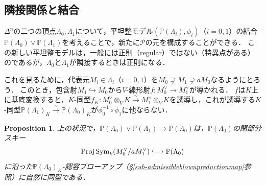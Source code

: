 \documentclass[a4paper,12pt, dvipdfmx]{jsbook}
\def\P{\mathbb{P}}
\def\Proj{\mathop{\mathrm{Proj}}\nolimits}
\def\Sym{\mathop{\mathrm{Sym}}\nolimits}
\theoremstyle{plain}
\newtheorem{prop}[thm]{\bfseries Proposition}
\theoremstyle{definition}
\def\longhookrightarrow{\lhook\joinrel\longrightarrow}
\begin{document}
\subsection{隣接関係と結合}\label{sub-join}
$\Delta^n$の二つの頂点$\Lambda_0,\Lambda_1$について，平坦整モデル$(\P(\Lambda_i),\phi_i)$（$i=0,1$）の結合$\P(\Lambda_0)\vee\P(\Lambda_1)$を考えることで，新たに$\mathcal{P}$の元を構成することができる．
この新しい平坦整モデルは，一般には正則（regular）ではない（特異点がある）のであるが，$\Lambda_0$と$\Lambda_1$が隣接するときは正則になる．

これを見るために，代表元$M_i\in\Lambda_i$（$i=0,1$）を$M_0\supsetneq M_1\supsetneq aM_0$なるようにとろう．
このとき，包含射$M_1\hookrightarrow M_0$から$V$-線形射$f\colon M^{\vee}_0\rightarrow M^{\vee}_1$が導かれる．
$f$は$K$上に基底変換すると，$K$-同型$f_K\colon M^{\vee}_0\otimes_VK\stackrel{\sim}{\rightarrow} M^{\vee}_1\otimes_VK$を誘導し，これが誘導する$K$-同型$\P(\Lambda_1)_K\stackrel{\sim}{\rightarrow}\P(\Lambda_0)_K$が$\phi^{-1}_0\circ\phi_1$に他ならない．

\begin{prop}\label{prop-adjacentblowup}{\rm 
上の状況で，$\P(\Lambda_0)\vee\P(\Lambda_1)\rightarrow\P(\Lambda_0)$は，$\P(\Lambda_0)$の閉部分スキー
$$
\Proj\Sym_k(M^{\vee}_0/aM^{\vee}_1)\longhookrightarrow\P(\Lambda_0)
$$
に沿った$\P(\Lambda_0)_K$-認容ブローアップ（\S\ref{sub-admissibleblowupreductionmap}参照）に自然に同型である．}
\end{prop}
\end{document}

